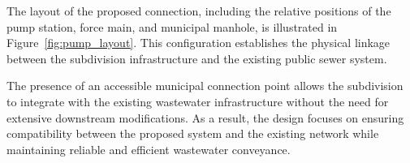 The layout of the proposed connection, including the relative positions of the pump station, force main, and municipal manhole, is illustrated in Figure~\ref{fig:pump_layout}. This configuration establishes the physical linkage between the subdivision infrastructure and the existing public sewer system.

The presence of an accessible municipal connection point allows the subdivision to integrate with the existing wastewater infrastructure without the need for extensive downstream modifications. As a result, the design focuses on ensuring compatibility between the proposed system and the existing network while maintaining reliable and efficient wastewater conveyance.
